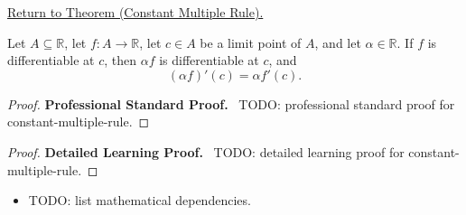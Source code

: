 \newpage
{}
\label{prf:constant-multiple-rule}

\begin{remark*}[Return]
\hyperref[thm:constant-multiple-rule]{Return to Theorem (Constant Multiple Rule).}
\end{remark*}

\begin{theorem*}
Let $A \subseteq \mathbb{R}$, let $f : A \to \mathbb{R}$, let $c \in A$ be a limit point of $A$, and let $\alpha \in \mathbb{R}$. If $f$ is differentiable at $c$, then $\alpha f$ is differentiable at $c$, and
\[
(\alpha f)'(c) = \alpha f'(c).
\]
\end{theorem*}

\begin{proof}
\textbf{Professional Standard Proof.}~
TODO: professional standard proof for constant-multiple-rule.
\end{proof}

\begin{proof}
\textbf{Detailed Learning Proof.}~
TODO: detailed learning proof for constant-multiple-rule.
\end{proof}

\begin{remark*}
\end{remark*}

\begin{dependencies}
\begin{itemize}
  \item TODO: list mathematical dependencies.
\end{itemize}
\end{dependencies}

\clearpage
